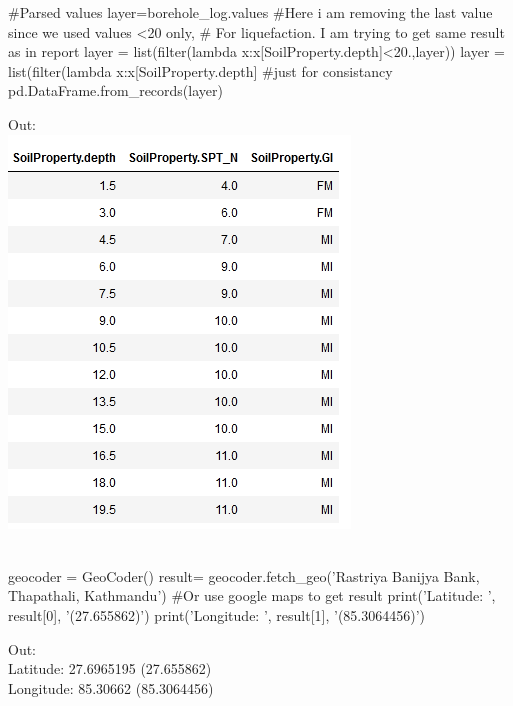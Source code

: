 \begin{python}
#Parsed values
layer=borehole_log.values
#Here i am removing the last value since we used values <20 only,
# For liquefaction. I am trying to get same result as in report
layer = list(filter(lambda x:x[SoilProperty.depth]<20.,layer))
layer = list(filter(lambda x:x[SoilProperty.depth]%
#just for consistancy
pd.DataFrame.from_records(layer)
\end{python}
Out:\\
\includegraphics[]{./images/sample/p1.png}\\\\

\begin{python}
geocoder = GeoCoder()
result= geocoder.fetch_geo('Rastriya Banijya Bank, Thapathali, Kathmandu')
#Or use google maps to get result
print('Latitude: ', result[0], '(27.655862)')
print('Longitude: ', result[1], '(85.3064456)')
\end{python}
Out:\\
Latitude:  27.6965195 (27.655862)\\
Longitude:  85.30662 (85.3064456)\\
\\


